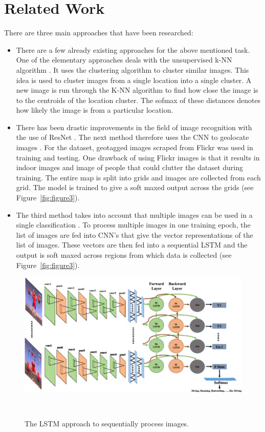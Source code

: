 \documentclass{sigchi}
\begin{document}
\section{Related Work}
There are three main approaches that have been researched:
\begin{itemize}
    \item There are a few already existing approaches for the above mentioned task. One of the elementary approaches deals with the unsupervised k-NN algorithm \cite{Hays:2008:im2gps}. It uses the clustering algorithm to cluster similar images. This idea is used to cluster images from a single location into a single cluster. A new image is run through the K-NN algorithm to find how close the image is to the centroids of the location cluster. The sofmax of these distances denotes how likely the image is from a particular location.
    \item There has been drastic improvements in the field of image recognition with the use of ResNet \cite{DBLP:journals/corr/HeZRS15}. The next method therefore uses the CNN to geolocate images \cite{DBLP:journals/corr/WeyandKP16}. For the dataset, geotagged images scraped from Flickr was used in training and testing. One drawback of using Flickr images is that it results in indoor images and image of people that could clutter the dataset during training. The entire map is split into grids and images are collected from each grid. The model is trained to give a soft maxed output across the grids (see Figure~\ref{fig:figure3}).
    \item The third method takes into account that multiple images can be used in a single classification \cite{DBLP:journals/corr/WeyandKP16}. To process multiple images in one training epoch, the list of images are fed into CNN's that give the vector representations of the list of images. These vectors are then fed into a sequential LSTM and the output is soft maxed across regions from which data is collected (see Figure~\ref{fig:figure3}).
\end{itemize}
\begin{figure}
  \centering
  \includegraphics[width=1.00\columnwidth]{figures/lstm.png}
  \caption{The LSTM approach to sequentially process images.}~\label{fig:figure2}
\end{figure}
\end{document}
